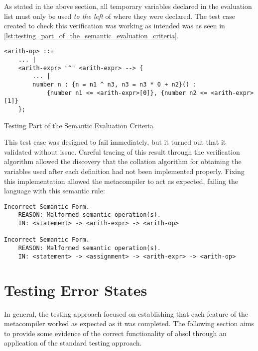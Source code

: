 As stated in the above section, all temporary variables declared in the evaluation list must only be used \textit{to the left} of where they were declared. 
The test case created to check this verification was working as intended was as seen in \autoref{lst:testing_part_of_the_semantic_evaluation_criteria}.

\begin{listing}[!htb]
\begin{verbatim}
<arith-op> ::= 
    ... |
    <arith-expr> "^" <arith-expr> --> {
        ... |
        number n : {n = n1 ^ n3, n3 = n3 * 0 + n2}() :
            {number n1 <= <arith-expr>[0]}, {number n2 <= <arith-expr>[1]}
    };
\end{verbatim}
\caption{Testing Part of the Semantic Evaluation Criteria}
\label{lst:testing_part_of_the_semantic_evaluation_criteria}
\end{listing}

This test case was designed to fail immediately, but it turned out that it validated without issue. 
Careful tracing of this result through the verification algorithm allowed the discovery that the collation algorithm for obtaining the variables used after each definition had not been implemented properly. 
Fixing this implementation allowed the metacompiler to act as expected, failing the language with this semantic rule:

\begin{verbatim}
Incorrect Semantic Form.
    REASON: Malformed semantic operation(s).
    IN: <statement> -> <arith-expr> -> <arith-op>

Incorrect Semantic Form.
    REASON: Malformed semantic operation(s).
    IN: <statement> -> <assignment> -> <arith-expr> -> <arith-op>
\end{verbatim}



\section{Testing Error States} %
\label{sec:testing_error_states}
In general, the testing approach focused on establishing that each feature of the metacompiler worked as expected as it was completed. 
The following section aims to provide some evidence of the correct functionality of \gls{absol} through an application of the standard testing approach. \\

